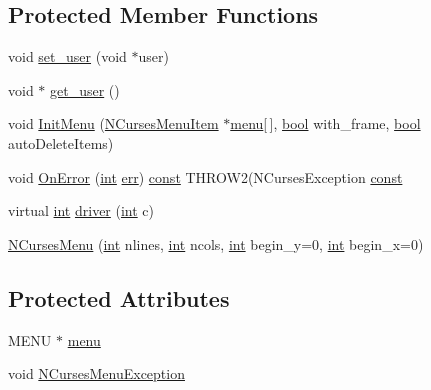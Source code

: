\subsection*{Protected Member Functions}
\begin{DoxyCompactItemize}
\item 
void \hyperlink{class_n_curses_menu_a6cfc42cbf65daccb29f75ba6b38dd5dd}{set\-\_\-user} (void $\ast$user)
\item 
void $\ast$ \hyperlink{class_n_curses_menu_aba4fcb674ba22dcdc25a84b118e0161a}{get\-\_\-user} ()
\item 
void \hyperlink{class_n_curses_menu_a9c33e10caacd84342e3433ad881a7d9a}{Init\-Menu} (\hyperlink{class_n_curses_menu_item}{N\-Curses\-Menu\-Item} $\ast$\hyperlink{class_n_curses_menu_a7fcf6bc30a980fa5e30b5f349fd1909d}{menu}\mbox{[}$\,$\mbox{]}, \hyperlink{term__entry_8h_a002004ba5d663f149f6c38064926abac}{bool} with\-\_\-frame, \hyperlink{term__entry_8h_a002004ba5d663f149f6c38064926abac}{bool} auto\-Delete\-Items)
\item 
void \hyperlink{class_n_curses_menu_a4c49d7187245db901df0d02ea6031d37}{On\-Error} (\hyperlink{term__entry_8h_ad65b480f8c8270356b45a9890f6499ae}{int} \hyperlink{class_n_curses_panel_a36889096b2df7770196fa535c6333068}{err}) \hyperlink{term__entry_8h_a57bd63ce7f9a353488880e3de6692d5a}{const} T\-H\-R\-O\-W2(N\-Curses\-Exception \hyperlink{term__entry_8h_a57bd63ce7f9a353488880e3de6692d5a}{const} 
\item 
virtual \hyperlink{term__entry_8h_ad65b480f8c8270356b45a9890f6499ae}{int} \hyperlink{class_n_curses_menu_a574c737787612e33f1ea8af577f64f94}{driver} (\hyperlink{term__entry_8h_ad65b480f8c8270356b45a9890f6499ae}{int} c)
\item 
\hyperlink{class_n_curses_menu_aa77216f902ee98dbb1c8ae9dfdeb2599}{N\-Curses\-Menu} (\hyperlink{term__entry_8h_ad65b480f8c8270356b45a9890f6499ae}{int} nlines, \hyperlink{term__entry_8h_ad65b480f8c8270356b45a9890f6499ae}{int} ncols, \hyperlink{term__entry_8h_ad65b480f8c8270356b45a9890f6499ae}{int} begin\-\_\-y=0, \hyperlink{term__entry_8h_ad65b480f8c8270356b45a9890f6499ae}{int} begin\-\_\-x=0)
\end{DoxyCompactItemize}
\subsection*{Protected Attributes}
\begin{DoxyCompactItemize}
\item 
M\-E\-N\-U $\ast$ \hyperlink{class_n_curses_menu_a7fcf6bc30a980fa5e30b5f349fd1909d}{menu}
\item 
void \hyperlink{class_n_curses_menu_a050594e68b0bd4ecbe44ea1609763a22}{N\-Curses\-Menu\-Exception}
\end{DoxyCompactItemize}
